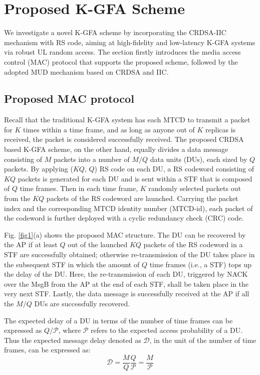 \documentclass[a4paper]{IEEEtran}
\begin{document}
\section{Proposed K-GFA Scheme}
We investigate a novel K-GFA scheme by incorporating the CRDSA-IIC mechanism with RS code, aiming at high-fidelity and low-latency K-GFA systems via robust UL random access. The section firstly introduces the media access control (MAC) protocol that supports the proposed scheme, followed by the adopted MUD mechanism based on CRDSA and IIC.  


\subsection{Proposed MAC protocol} 
Recall that the traditional K-GFA system has each MTCD to transmit a packet for $K$ times within a time frame, and as long as anyone out of $K$ replicas is received, the packet is considered successfully received. The proposed CRDSA based K-GFA scheme, on the other hand, equally divides a data message consisting of $M$ packets into a number of $M/Q$ data units (DUs), each sized by $Q$ packets. By applying ($KQ$, $Q$) RS code on each DU, a RS codeword consisting of $KQ$ packets is generated for each DU and is sent within a STF that is composed of $Q$ time frames. Then in each time frame, $K$ randomly selected packets out from the $KQ$ packets of the RS codeword are launched. Carrying the packet index and the corresponding MTCD identity number (MTCD-id), each packet of the codeword is further deployed with a cyclic redundancy check (CRC) code. 

Fig. \ref{fig1}(a) shows the proposed MAC structure. The DU can be recovered by the AP if at least $Q$ out of the launched $KQ$ packets of the RS codeword in a STF are successfully obtained; otherwise re-transmission of the DU takes place in the subsequent STF in which the amount of $Q$ time frames (i.e., a STF) tops up the delay of the DU. Here, the re-transmission of each DU, triggered by NACK over the MsgB from the AP at the end of each STF, shall be taken place in the very next STF. Lastly, the data message is successfully received at the AP if all the $M/Q$ DUs are successfully recovered. 
 
The expected delay of a DU in terms of the number of time frames can be expressed as $Q/{\mathcal{P}}$, where $\mathcal{P}$ refers to the expected access probability of a DU. Thus the expected message delay denoted as $\mathcal{D}$, in the unit of the number of time frames, can be expressed as:
\begin{equation}
\mathcal{D} =  \frac{M}{Q} \frac{Q}{\mathcal{P}} = \frac{M}{\mathcal{P}}
\label{eq: delay}
\end{equation}
\end{document}
